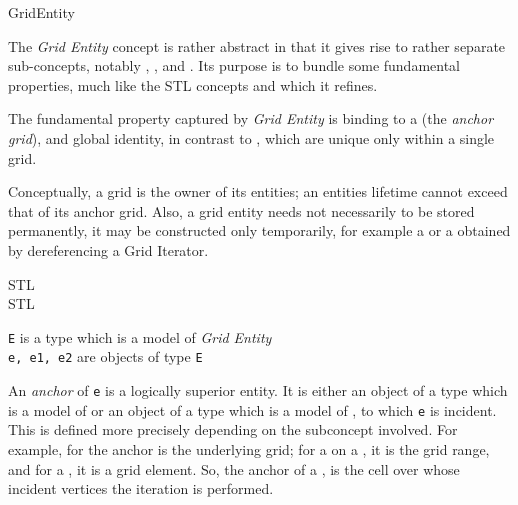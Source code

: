 \begin{Label}{GridEntity}
\end{Label}

The {\em Grid Entity\/} concept is rather abstract in that it gives rise to rather
separate sub-concepts, notably ,
,
and .
Its purpose is to bundle some fundamental properties, much like the STL concepts
 and
which it refines.

The fundamental property captured by {\em Grid Entity\/} is binding to a 
(the {\em anchor grid\/}), 
and global identity, 
in contrast to ,
which are unique only within a single grid.

Conceptually, a grid is the owner of its entities; 
an entities lifetime cannot exceed that of
its anchor grid. 
Also, a grid entity needs  not necessarily to be stored permanently,
it may be constructed only temporarily, 
for example a
or a  
obtained by dereferencing a  Grid Iterator.

STL 
\\
STL 


{\tt E} is a type which is a model of {\em Grid Entity\/}
\\
{\tt e, e1, e2} are objects of type {\tt E}


      \label{anchor}
      An {\em anchor\/} of {\tt e} is a logically superior entity.
      It is either an object of a type which is a model of 
      or an object of a type which is a model of 
      ,
      to which {\tt e} is incident. 
      This is defined more precisely depending on the
      subconcept involved. For example, for
      the anchor is the underlying grid;
      for a 
      on a 
      ,
      it is the grid range, 
      and for a
      ,
      it is a grid element.
      So, the anchor of a 
      ,
      is the cell over whose incident vertices the iteration is performed.
 
